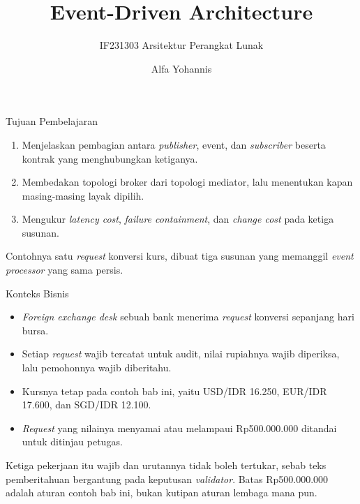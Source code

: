 \documentclass[aspectratio=169, table, 12pt]{beamer}
\title{\Huge{Event-Driven Architecture}}
\subtitle{IF231303 Arsitektur Perangkat Lunak}
\author{Alfa Yohannis}
\begin{document}
\frame{\titlepage}

\begin{frame}{{\Large Tujuan Pembelajaran}}
  \vspace{10pt}
  \begin{enumerate}
    \item Menjelaskan pembagian antara \textit{publisher}, event, dan \textit{subscriber} beserta
          kontrak yang menghubungkan ketiganya.
    \item Membedakan topologi broker dari topologi mediator, lalu menentukan
          kapan masing-masing layak dipilih.
    \item Mengukur \textit{latency cost}, \textit{failure containment}, dan
          \textit{change cost} pada ketiga susunan.
  \end{enumerate}

  \vspace{10pt}
  {\small Contohnya satu \textit{request} konversi kurs, dibuat tiga susunan yang
  memanggil \textit{event processor} yang sama persis.}
\end{frame}

\begin{frame}{{\Large Konteks Bisnis}}
  \vspace{8pt}
  \begin{itemize}\small
    \item \textit{Foreign exchange desk} sebuah bank menerima \textit{request}
          konversi sepanjang hari bursa.
    \item Setiap \textit{request} wajib tercatat untuk audit, nilai rupiahnya
          wajib diperiksa, lalu pemohonnya wajib diberitahu.
    \item Kursnya tetap pada contoh bab ini, yaitu USD/IDR 16.250, EUR/IDR
          17.600, dan SGD/IDR 12.100.
    \item \textit{Request} yang nilainya menyamai atau melampaui
          Rp500.000.000 ditandai untuk ditinjau petugas.
  \end{itemize}

  \vspace{8pt}
  {\small Ketiga pekerjaan itu wajib dan urutannya tidak boleh tertukar, sebab
  teks pemberitahuan bergantung pada keputusan \textit{validator}. Batas
  Rp500.000.000 adalah aturan contoh bab ini, bukan kutipan aturan lembaga mana
  pun.}
\end{frame}
\end{document}
